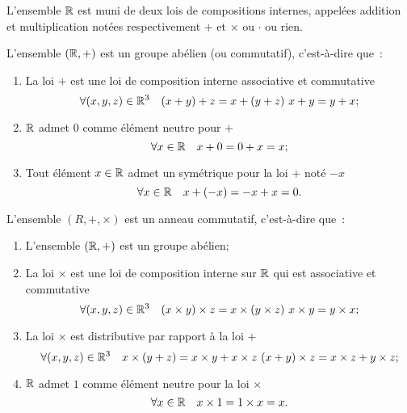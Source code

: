 L'ensemble \(\mathbb{R}\) est muni de deux lois de compositions internes, appelées
addition et multiplication notées respectivement \( + \) et \(\times\) ou
\(\cdot\) ou rien.
\begin{prop}
  L'ensemble \((\mathbb{R}, +)\) est un groupe abélien (ou commutatif), c'est-à-dire
  que~:
  \begin{enumerate}
    \item La loi \( + \) est une loi de composition interne associative et
      commutative
      \begin{equation}
        \forall (x, y, z) \in \mathbb{R}^3 \quad (x + y) + z = x + (y + z) \ x + y = y +
        x;
      \end{equation}
    \item \(\mathbb{R}\) admet \(0\) comme élément neutre pour \( + \)
      \begin{equation}
        \forall x \in \mathbb{R} \quad x + 0 = 0 + x = x;
      \end{equation}
    \item Tout élément \(x\in\mathbb{R}\) admet un symétrique pour la loi \( + \) noté
      \( - x\)
      \begin{equation}
        \forall x \in \mathbb{R} \quad x + ( - x) = -x + x = 0.
      \end{equation}
  \end{enumerate}
\end{prop}
\begin{prop}
  L'ensemble \((R, +, \times)\) est un anneau commutatif, c'est-à-dire que~:
  \begin{enumerate}
    \item L'ensemble \((\mathbb{R}, +)\) est un groupe abélien;
    \item La loi \(\times\) est une loi de composition interne sur \(\mathbb{R}\) qui
      est associative et commutative
      \begin{equation}
        \forall (x, y, z) \in \mathbb{R}^3 \quad (x\times y)\times z = x\times (y\times
        z) \ x\times y = y\times x;
      \end{equation}
    \item La loi \(\times\) est distributive par rapport à la loi \( + \)
      \begin{equation}
        \forall (x, y, z) \in \mathbb{R}^3 \quad x\times(y + z) = x\times y + x\times z
        \ (x + y)\times z = x\times z + y\times z;
      \end{equation}
    \item \(\mathbb{R}\) admet \(1\) comme élément neutre pour la loi \(\times\)
      \begin{equation}
        \forall x \in \mathbb{R} \quad x\times 1 = 1\times x = x.
      \end{equation}
  \end{enumerate}
\end{prop}
